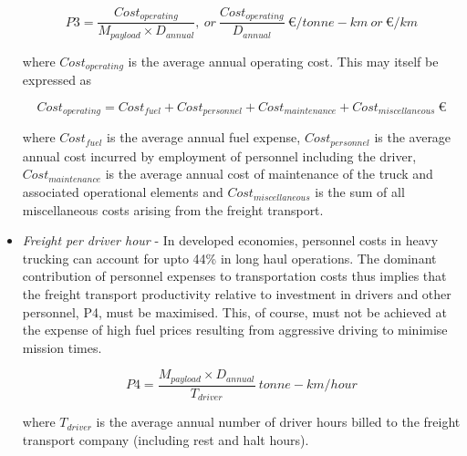\documentclass[ExampleMasters.tex]{subfiles}
\begin{document}
\begin{itemize}
			\begin{equation}
				P3 = \frac{Cost_{operating}}{M_{payload} \times D_{annual}},\ or\ \frac{Cost_{operating}}{D_{annual}} \  \euro/tonne-km \ or \ \euro/km 
			\end{equation}

			where $Cost_{operating}$  is the average annual operating cost. This may itself be expressed as 

			\begin{equation}
				Cost_{operating} = Cost_{fuel} + Cost_{personnel} + Cost_{maintenance} + Cost_{miscellaneous} \ \euro
			\end{equation}

			where $Cost_{fuel}$  is the average annual fuel expense, $Cost_{personnel}$  is the average annual cost incurred by employment of personnel including the driver, $Cost_{maintenance}$  is the average annual cost of maintenance of the truck and associated operational elements and $Cost_{miscellaneous}$  is the sum of all miscellaneous costs arising from the freight transport.\\

			\item \textit{Freight per driver hour} - In developed economies, personnel costs in heavy trucking can account for upto 44\% in long haul operations. The dominant contribution of personnel expenses to transportation costs thus implies that the freight transport productivity relative to investment in drivers and other personnel, P4, must be maximised. This, of course, must not be achieved at the expense of high fuel prices resulting from aggressive driving to minimise mission times. 

			\begin{equation}
				P4 = \frac{M_{payload} \times D_{annual}}{T_{driver}} \ tonne-km/hour
			\end{equation}

			where $T_{driver}$  is the average annual number of driver hours billed to the freight transport company (including rest and halt hours).\\


\end{itemize}
\end{document}
